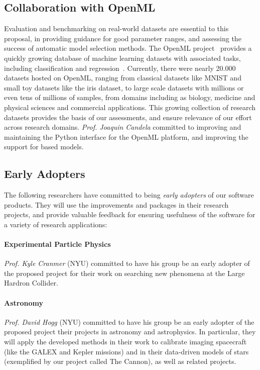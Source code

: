\subsection{Collaboration with OpenML}
Evaluation and benchmarking on real-world datasets are essential to this
proposal, in providing guidance for good parameter ranges, and assessing the
success of automatic model selection methods. The OpenML
project~\autocite{van2013openml} provides a quickly growing database of machine
learning datasets with associated tasks, including classification and
regression~\autocite{vanschoren2014openml}. Currently, there
were nearly 20.000 datasets hosted on OpenML, ranging from classical datasets
like MNIST and small toy datasets like the iris dataset, to large
scale datasets with millions or even tens of millions of samples, from domains
including as biology, medicine and physical sciences and commercial applications.
This growing collection of research datasets provides the basis of our
assessments, and ensure relevance of our effort across research domains.
\emph{Prof. Joaquin Candela} committed to improving and maintaining the Python
interface for the OpenML platform, and improving the support for \sklearn{}
based models.

\subsection{Early Adopters}
The following researchers have committed to being \emph{early adopters} of our
software products. They will use the improvements and packages in their
research projects, and provide valuable feedback for ensuring usefulness of the
software for a variety of research applications:

\paragraph{Experimental Particle Physics}
\emph{Prof. Kyle Cranmer} (NYU) committed to have his group be an early adopter of the
proposed project for their work on searching new phenomena at the Large Hardron
Collider.

\paragraph{Astronomy}
\emph{Prof. David Hogg} (NYU) committed to have his group be an
early adopter of the proposed project their projects in astronomy and
astrophysics. In particular, they will apply the developed methods in their
work to calibrate imaging spacecraft (like the GALEX and Kepler missions) and
in their data-driven models of stars (exemplified by our project called The
Cannon), as well as related projects.

